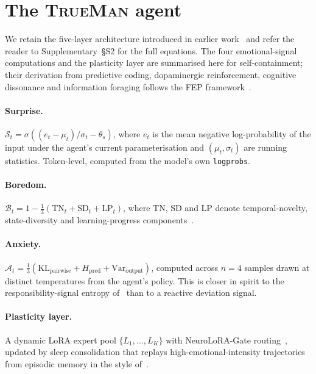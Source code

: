 \documentclass[pdflatex,sn-mathphys-num]{sn-jnl}
\newcommand{\TrueMan}{\textsc{TrueMan}}
\theoremstyle{thmstyleone}
\theoremstyle{thmstylethree}
\begin{document}
\section{The \TrueMan{} agent}\label{sec:framework}

We retain the five-layer architecture introduced in earlier work~\cite{trueman_v1_arxiv} and refer the reader to Supplementary~\S S2 for the full equations. The four emotional-signal computations and the plasticity layer are summarised here for self-containment; their derivation from predictive coding, dopaminergic reinforcement, cognitive dissonance and information foraging follows the FEP framework~\cite{friston2022active, colas2022autotelic, festinger1957cognitive, kawato2023metacognitive}.

\paragraph{Surprise.} $\mathcal{S}_t = \sigma\!\left((e_t - \mu_t)/\sigma_t - \theta_s\right)$, where $e_t$ is the mean negative log-probability of the input under the agent's current parameterisation and $(\mu_t,\sigma_t)$ are running statistics. Token-level, computed from the model's own \texttt{logprobs}.

\paragraph{Boredom.} $\mathcal{B}_t = 1 - \tfrac{1}{3}(\text{TN}_t + \text{SD}_t + \text{LP}_t)$, where TN, SD and LP denote temporal-novelty, state-diversity and learning-progress components~\cite{colas2022survey}.

\paragraph{Anxiety.} $\mathcal{A}_t = \tfrac{1}{3}(\text{KL}_{\text{pairwise}} + H_{\text{pred}} + \text{Var}_{\text{output}})$, computed across $n=4$ samples drawn at distinct temperatures from the agent's policy. This is closer in spirit to the responsibility-signal entropy of~\cite{kawato2023metacognitive} than to a reactive deviation signal.

\paragraph{Plasticity layer.} A dynamic LoRA expert pool $\{L_1,\ldots,L_K\}$ with NeuroLoRA-Gate routing~\cite{yang2026neurolora, trueman_v1_arxiv}, updated by sleep consolidation that replays high-emotional-intensity trajectories from episodic memory in the style of~\cite{sorrenti2024wake, delanois2026sleep}.
\end{document}
